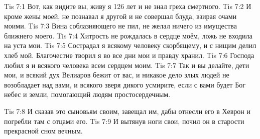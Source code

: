 \vs Tis 7:1
Вот, как видите вы, живу я 126 лет и не знал греха смертного.
\vs Tis 7:2
И кроме жены моей, не познавал я другой и не совершал блуда,
взирая очами моими.
\vs Tis 7:3
Вина соблазняющего не пил, не желал ничего из имущества ближнего моего.
\vs Tis 7:4
Хитрость не рождалась в сердце моём, ложь не входила на уста мои.
\vs Tis 7:5
Сострадал я всякому человеку скорбящему, и с нищим делил хлеб мой.
Благочестие творил я во все дни мои и правду хранил.
\vs Tis 7:6
Господа любил я и всякого человека всем сердцем моим.
\vs Tis 7:7
Так и вы делайте, дети мои, и всякий дух Велиаров бежит от вас,
и никакое дело злых людей не возобладает над вами,
и всякого зверя дикого усмирите,
если с вами будет Бог небес и земли, помогающий людям простосердечным.

\vs Tis 7:8
И сказав это сыновьям своим, завещал им, дабы отнесли его в Хеврон и
погребли там с отцами его.
\vs Tis 7:9
И вытянув ноги свои, почил он в старости прекрасной сном вечным.
